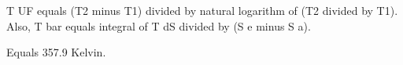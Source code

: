 T UF equals (T2 minus T1) divided by natural logarithm of (T2 divided by T1).  
Also, T bar equals integral of T dS divided by (S e minus S a).  

Equals 357.9 Kelvin.